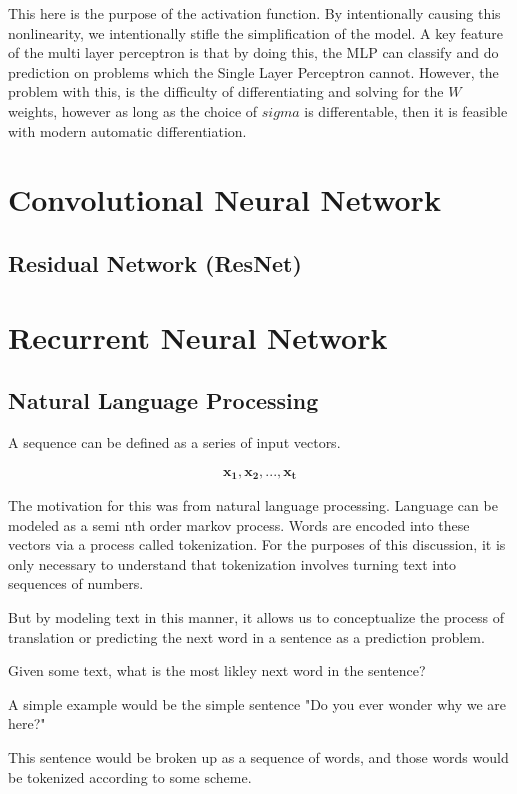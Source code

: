 \documentclass{article}
\begin{document}
This here is the purpose of the activation function. By intentionally causing this nonlinearity, we intentionally stifle the simplification of the model. A key feature of the multi layer perceptron is that by doing this, the MLP can classify and do prediction on problems which the Single Layer Perceptron cannot. However, the problem with this, is the difficulty of differentiating and solving for the $W$ weights, however as long as the choice of $sigma$ is differentable, then it is feasible with modern automatic differentiation.


\section{Convolutional Neural Network}
\subsection{Residual Network (ResNet)}

\section{Recurrent Neural Network}
\subsection{Natural Language Processing}
A sequence can be defined as a series of input vectors.

\begin{align*}
\mathbf{x_1}, \mathbf{x_2}, ... , \mathbf{x_t}
\end{align*}

The motivation for this was from natural language processing. Language can be modeled as a semi nth order markov process. Words are encoded into these vectors via a process called tokenization. For the purposes of this discussion, it is only necessary to understand that tokenization involves turning text into sequences of numbers.

But by modeling text in this manner, it allows us to conceptualize the process of translation or predicting the next word in a sentence as a prediction problem.

Given some text, what is the most likley next word in the sentence?

A simple example would be the simple sentence "Do you ever wonder why we are here?"

This sentence would be broken up as a sequence of words, and those words would be tokenized according to some scheme.
\end{document}

